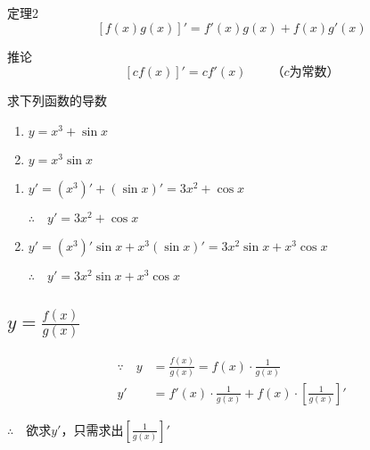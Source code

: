 \begin{thm}{定理2}
\[[f(x)g(x)]' =f' (x)g(x)+f(x)g' (x)\]
\end{thm}

\begin{thm}{推论}
   \[ [cf(x)]'=cf'(x)\qquad \text{（$c$为常数）}\]
\end{thm}

\begin{example}
求下列函数的导数
\begin{multicols}{2}
\begin{enumerate}[(1)]
    \item $y=x^3+\sin x$
    \item $y=x^3\sin x$
\end{enumerate}
\end{multicols}
\end{example}

\begin{solution}
\begin{enumerate}[(1)]
    \item $y'=(x^3)'+(\sin x)'=3x^2+\cos x$

$\therefore\quad y'=3x^2+\cos x$

\item $y'=(x^3)'\sin x+x^3(\sin x)'=3x^2\sin x+x^3\cos x$

$\therefore\quad y'=3x^2\sin x+x^3\cos x$
 \end{enumerate}   
\end{solution}

\subsection{$y=\frac{f(x)}{g(x)}$}
\[\begin{split}
    \because\quad  y&=\frac{f(x)}{g(x)}=f(x)\cdot \frac{1}{g(x)}\\
y'&=f'(x)\cdot \frac{1}{g(x)}+f(x)\cdot \left[\frac{1}{g(x)}\right]'
\end{split}\]

$\therefore\quad $欲求$y'$，只需求出$\left[\frac{1}{g(x)}\right]'$

